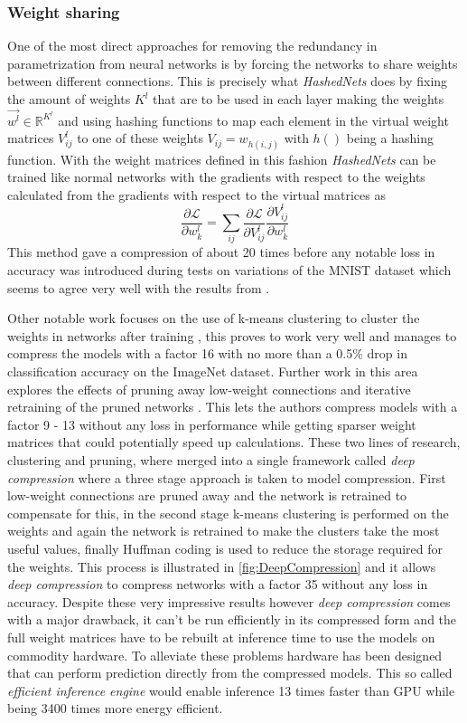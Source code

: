 \documentclass{kththesis}
\newcommand{\bibentry}[1]{\parencite{#1}}
\begin{document}
\subsubsection{Weight sharing}
One of the most direct approaches for removing the redundancy in parametrization
from neural networks is by forcing the networks to share weights between
different connections. This is precisely what \emph{HashedNets}
\bibentry{chen2015compressing} does by fixing the amount of weights \(K^l\) that
are to be used in each layer making the weights \(\vec{w^l} \in
\mathbb{R}^{K^l}\) and using hashing functions to map each element in the
virtual weight matrices \(V_{ij}^l\) to one of these weights \(V_{ij} =
w_{h(i,j)}\) with \(h()\) being a hashing function. With the weight matrices
defined in this fashion \emph{HashedNets} can be trained like normal networks
with the gradients with respect to the weights calculated from the gradients
with respect to the virtual matrices as  
\[ \frac{\partial\mathcal{L}}{\partial w_k^l} = \sum_{ij} \frac{\partial\mathcal{L}}{\partial V_{ij}^l}\frac{\partial V_{ij}^l}{\partial w_k^l} \]
This method gave a compression of about 20 times before any notable loss in
accuracy was introduced during tests on variations of the MNIST dataset which
seems to agree very well with the results from \bibentry{denil2013predicting}. 

Other notable work focuses on the use of k-means clustering to cluster the
weights in networks after training \bibentry{gong2014compressing}, this proves
to work very well and manages to compress the models with a factor 16 with no
more than a 0.5\% drop in classification accuracy on the ImageNet dataset.
Further work in this area explores the effects of pruning away low-weight
connections and iterative retraining of the pruned networks
\bibentry{han2015learning}. This lets the authors compress models with a factor
9 - 13 without any loss in performance while getting sparser weight matrices
that could potentially speed up calculations. These two lines of research,
clustering and pruning, where merged into a single framework called \emph{deep
  compression} \bibentry{han2015deep} where a three stage approach is taken to
model compression. First low-weight connections are pruned away and the network
is retrained to compensate for this, in the second stage k-means clustering is
performed on the weights and again the network is retrained to make the clusters
take the most useful values, finally Huffman coding
\bibentry{van1976construction} is used to reduce the storage required for the
weights. This process is illustrated in \cref{fig:DeepCompression} and it allows \emph{deep compression} to compress networks with a
factor 35 without any loss in accuracy. Despite these very impressive results
however \emph{deep compression} comes with a major drawback, it can't be run
efficiently in its compressed form and the full weight matrices have to be
rebuilt at inference time to use the models on commodity hardware. To alleviate
these problems hardware has been designed that can perform prediction directly
from the compressed models. This so called \emph{efficient inference engine}
\bibentry{han2016eie} would enable inference 13 times faster than GPU while
being 3400 times more energy efficient.  
\end{document}
